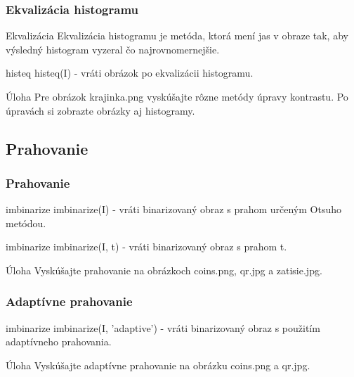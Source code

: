 \documentclass{beamer}
\begin{document}
\begin{frame}
\frametitle{Ekvalizácia histogramu}
\begin{block}{Ekvalizácia}
Ekvalizácia histogramu je metóda, ktorá mení jas v obraze tak, aby výsledný histogram vyzeral čo najrovnomernejšie.
\end{block}

\begin{block}{histeq}
histeq(I) - vráti obrázok po ekvalizácii histogramu.
\end{block}

\begin{block}{Úloha}
Pre obrázok krajinka.png vyskúšajte rôzne metódy úpravy kontrastu. Po úpravách si zobrazte obrázky aj histogramy.
\end{block}
\end{frame}

\subsection{Prahovanie}
\begin{frame}
\frametitle{Prahovanie}
\begin{block}{imbinarize}
imbinarize(I) - vráti binarizovaný obraz s prahom určeným Otsuho metódou.
\end{block}

\begin{block}{imbinarize}
imbinarize(I, t) - vráti binarizovaný obraz s prahom t.
\end{block}

\begin{block}{Úloha}
Vyskúšajte prahovanie na obrázkoch coins.png, qr.jpg a zatisie.jpg.
\end{block}
\end{frame}

\begin{frame}
\frametitle{Adaptívne prahovanie}
\begin{block}{imbinarize}
imbinarize(I, 'adaptive') - vráti binarizovaný obraz s použitím adaptívneho prahovania.
\end{block}

\begin{block}{Úloha}
Vyskúšajte adaptívne prahovanie na obrázku coins.png a qr.jpg.
\end{block}
\end{frame}
\end{document}

